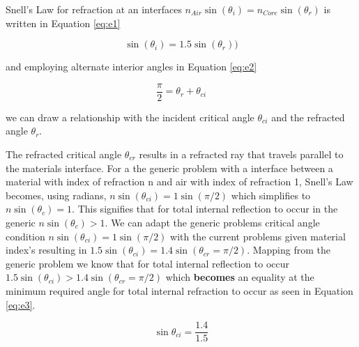 \documentclass[main.tex]{subfiles}
\begin{document}
Snell's Law for refraction at an interfaces $n_{Air}\sin(\theta_i) = n_{Core}\sin(\theta_{r})$ is written in Equation  \ref{eq:e1}

\begin{equation}\label{eq:e1}
\sin(\theta_i) = 1.5\sin(\theta_{r}))
\end{equation}

and employing alternate interior angles in Equation \ref{eq:e2}

\begin{equation}\label{eq:e2}
\frac{\pi}{2} = \theta_{r} + \theta_{ci}
\end{equation}

we can draw a relationship with the incident critical angle $\theta_{ci}$ and the refracted angle $\theta_{r}$.

The refracted critical angle $\theta_{cr}$ results in a refracted ray that travels parallel to the materials interface. For a the generic problem with a interface between a material with index of refraction n and air with index of refraction 1, Snell's Law becomes, using radians, $n\sin(\theta_{ci}) = 1\sin(\pi/2)$ which simplifies to $n\sin(\theta_c) = 1$. This signifies that for total internal reflection to occur in the generic  $n\sin(\theta_c) > 1$. We can adapt the generic problems critical angle condition $n\sin(\theta_{ci}) = 1\sin(\pi/2)$ with the current problems given material index's resulting in  $1.5\sin(\theta_{ci}) = 1.4\sin(\theta_{cr} = \pi/2)$. Mapping from the generic problem we know that for total internal reflection to occur $1.5\sin(\theta_{ci}) > 1.4\sin(\theta_{cr} = \pi/2)$ which \textbf{becomes} an equality at the minimum required angle for total internal refraction to occur as seen in Equation \ref{eq:e3}. 

\begin{equation}\label{eq:e3}
\sin\theta_{ci} = \frac{1.4}{1.5}
\end{equation}


\end{document}

